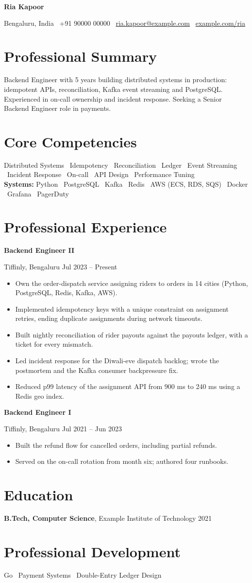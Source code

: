 \documentclass[10pt,a4paper]{article}
\newcommand{\role}[3]{\textbf{#1}\par #2 \hfill #3\par}
\begin{document}
{\LARGE\bfseries Ria Kapoor}\par
Bengaluru, India \textbar\ +91 90000 00000 \textbar\ \href{mailto:ria.kapoor@example.com}{ria.kapoor@example.com} \textbar\ \href{https://example.com/ria}{example.com/ria}\par

\section{Professional Summary}
Backend Engineer with 5 years building distributed systems in production: idempotent APIs, reconciliation, Kafka event streaming and PostgreSQL. Experienced in on-call ownership and incident response. Seeking a Senior Backend Engineer role in payments.

\section{Core Competencies}
Distributed Systems \textbullet\ Idempotency \textbullet\ Reconciliation \textbullet\ Ledger \textbullet\ Event Streaming \textbullet\ Incident Response \textbullet\ On-call \textbullet\ API Design \textbullet\ Performance Tuning\\
\textbf{Systems:} Python \textbullet\ PostgreSQL \textbullet\ Kafka \textbullet\ Redis \textbullet\ AWS (ECS, RDS, SQS) \textbullet\ Docker \textbullet\ Grafana \textbullet\ PagerDuty

\section{Professional Experience}
\role{Backend Engineer II}{Tiffinly, Bengaluru}{Jul 2023 -- Present}
\begin{itemize}
  \item Own the order-dispatch service assigning riders to orders in 14 cities (Python, PostgreSQL, Redis, Kafka, AWS).
  \item Implemented idempotency keys with a unique constraint on assignment retries, ending duplicate assignments during network timeouts.
  \item Built nightly reconciliation of rider payouts against the payouts ledger, with a ticket for every mismatch.
  \item Led incident response for the Diwali-eve dispatch backlog; wrote the postmortem and the Kafka consumer backpressure fix.
  \item Reduced p99 latency of the assignment API from 900 ms to 240 ms using a Redis geo index.
\end{itemize}
\role{Backend Engineer I}{Tiffinly, Bengaluru}{Jul 2021 -- Jun 2023}
\begin{itemize}
  \item Built the refund flow for cancelled orders, including partial refunds.
  \item Served on the on-call rotation from month six; authored four runbooks.
\end{itemize}

\section{Education}
\textbf{B.Tech, Computer Science}, Example Institute of Technology \hfill 2021

\section{Professional Development}
Go \textbullet\ Payment Systems \textbullet\ Double-Entry Ledger Design
\end{document}
